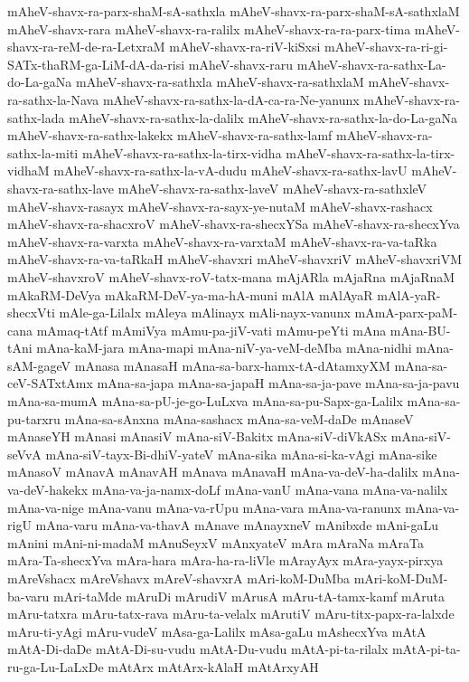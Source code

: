 {mAheV-shavx-ra-parx-shaM-sA-sathxla
mAheV-shavx-ra-parx-shaM-sA-sathxlaM
mAheV-shavx-rara
mAheV-shavx-ra-ralilx
mAheV-shavx-ra-ra-parx-tima
mAheV-shavx-ra-reM-de-ra-LetxraM
mAheV-shavx-ra-riV-kiSxsi
mAheV-shavx-ra-ri-gi-SATx-thaRM-ga-LiM-dA-da-risi
mAheV-shavx-raru
mAheV-shavx-ra-sathx-La-do-La-gaNa
mAheV-shavx-ra-sathxla
mAheV-shavx-ra-sathxlaM
mAheV-shavx-ra-sathx-la-Nava
mAheV-shavx-ra-sathx-la-dA-ca-ra-Ne-yanunx
mAheV-shavx-ra-sathx-lada
mAheV-shavx-ra-sathx-la-dalilx
mAheV-shavx-ra-sathx-la-do-La-gaNa
mAheV-shavx-ra-sathx-lakekx
mAheV-shavx-ra-sathx-lamf
mAheV-shavx-ra-sathx-la-miti
mAheV-shavx-ra-sathx-la-tirx-vidha
mAheV-shavx-ra-sathx-la-tirx-vidhaM
mAheV-shavx-ra-sathx-la-vA-dudu
mAheV-shavx-ra-sathx-lavU
mAheV-shavx-ra-sathx-lave
mAheV-shavx-ra-sathx-laveV
mAheV-shavx-ra-sathxleV
mAheV-shavx-rasayx
mAheV-shavx-ra-sayx-ye-nutaM
mAheV-shavx-rashacx
mAheV-shavx-ra-shacxroV
mAheV-shavx-ra-shecxYSa
mAheV-shavx-ra-shecxYva
mAheV-shavx-ra-varxta
mAheV-shavx-ra-varxtaM
mAheV-shavx-ra-va-taRka
mAheV-shavx-ra-va-taRkaH
mAheV-shavxri
mAheV-shavxriV
mAheV-shavxriVM
mAheV-shavxroV
mAheV-shavx-roV-tatx-mana
mAjARla
mAjaRna
mAjaRnaM
mAkaRM-DeVya
mAkaRM-DeV-ya-ma-hA-muni
mAlA
mAlAyaR
mAlA-yaR-shecxVti
mAle-ga-Lilalx
mAleya
mAlinayx
mAli-nayx-vanunx
mAmA-parx-paM-cana
mAmaq-tAtf
mAmiVya
mAmu-pa-jiV-vati
mAmu-peYti
mAna
mAna-BU-tAni
mAna-kaM-jara
mAna-mapi
mAna-niV-ya-veM-deMba
mAna-nidhi
mAna-sAM-gageV
mAnasa
mAnasaH
mAna-sa-barx-hamx-tA-dAtamxyXM
mAna-sa-ceV-SATxtAmx
mAna-sa-japa
mAna-sa-japaH
mAna-sa-ja-pave
mAna-sa-ja-pavu
mAna-sa-mumA
mAna-sa-pU-je-go-LuLxva
mAna-sa-pu-Sapx-ga-Lalilx
mAna-sa-pu-tarxru
mAna-sa-sAnxna
mAna-sashacx
mAna-sa-veM-daDe
mAnaseV
mAnaseYH
mAnasi
mAnasiV
mAna-siV-Bakitx
mAna-siV-diVkASx
mAna-siV-seVvA
mAna-siV-tayx-Bi-dhiV-yateV
mAna-sika
mAna-si-ka-vAgi
mAna-sike
mAnasoV
mAnavA
mAnavAH
mAnava
mAnavaH
mAna-va-deV-ha-dalilx
mAna-va-deV-hakekx
mAna-va-ja-namx-doLf
mAna-vanU
mAna-vana
mAna-va-nalilx
mAna-va-nige
mAna-vanu
mAna-va-rUpu
mAna-vara
mAna-va-ranunx
mAna-va-rigU
mAna-varu
mAna-va-thavA
mAnave
mAnayxneV
mAnibxde
mAni-gaLu
mAnini
mAni-ni-madaM
mAnuSeyxV
mAnxyateV
mAra
mAraNa
mAraTa
mAra-Ta-shecxYva
mAra-hara
mAra-ha-ra-liVle
mArayAyx
mAra-yayx-pirxya
mAreVshacx
mAreVshavx
mAreV-shavxrA
mAri-koM-DuMba
mAri-koM-DuM-ba-varu
mAri-taMde
mAruDi
mArudiV
mArusA
mAru-tA-tamx-kamf
mAruta
mAru-tatxra
mAru-tatx-rava
mAru-ta-velalx
mArutiV
mAru-titx-papx-ra-lalxde
mAru-ti-yAgi
mAru-vudeV
mAsa-ga-Lalilx
mAsa-gaLu
mAshecxYva
mAtA
mAtA-Di-daDe
mAtA-Di-su-vudu
mAtA-Du-vudu
mAtA-pi-ta-rilalx
mAtA-pi-ta-ru-ga-Lu-LaLxDe
mAtArx
mAtArx-kAlaH
mAtArxyAH
}
